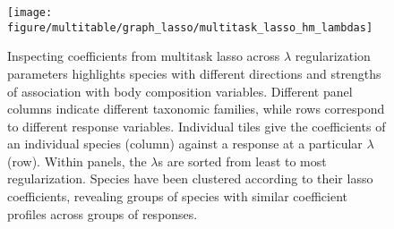 \begin{figure}
  \centering
  \texttt{[image: figure/multitable/graph\_lasso/multitask\_lasso\_hm\_lambdas]}
  \caption{ Inspecting coefficients from multitask lasso across $\lambda$
    regularization parameters highlights species with different directions and
    strengths of association with body composition variables. Different panel
    columns indicate different taxonomic families, while rows correspond to
    different response variables. Individual tiles give the coefficients of an
    individual species (column) against a response at a particular $\lambda$
    (row). Within panels, the $\lambda$s are sorted from least to most
    regularization. Species have been clustered according to their lasso
    coefficients, revealing groups of species with similar coefficient profiles
    across groups of responses.
    \label{fig:graph_lasso_multitask_lasso_hm_lambdas} }
\end{figure}
